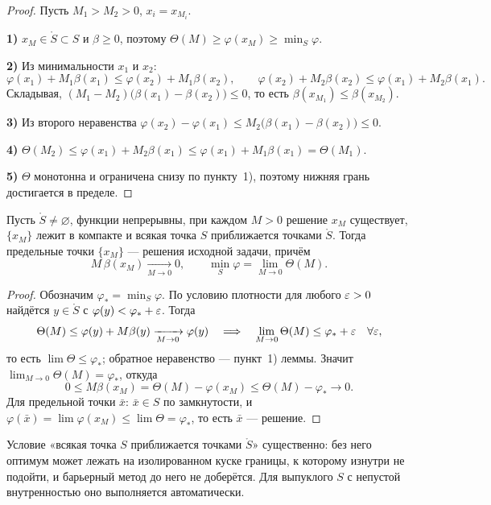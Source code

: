 \begin{proof}
Пусть $M_1 > M_2 > 0$, $x_i = x_{M_i}$.

\textbf{1)} $x_M \in \mathring{S} \subset S$ и $\beta \ge 0$, поэтому
$\Theta(M) \ge \varphi(x_M) \ge \min_S\varphi$.

\textbf{2)} Из минимальности $x_1$ и $x_2$:
\[
  \varphi(x_1) + M_1\beta(x_1) \le \varphi(x_2) + M_1\beta(x_2) ,
  \qquad
  \varphi(x_2) + M_2\beta(x_2) \le \varphi(x_1) + M_2\beta(x_1) .
\]
Складывая, $(M_1 - M_2)\big(\beta(x_1) - \beta(x_2)\big) \le 0$, то есть
$\beta(x_{M_1}) \le \beta(x_{M_2})$.

\textbf{3)} Из второго неравенства
$\varphi(x_2) - \varphi(x_1) \le M_2\big(\beta(x_1) - \beta(x_2)\big) \le 0$.

\textbf{4)}
$\Theta(M_2) \le \varphi(x_1) + M_2\beta(x_1) \le \varphi(x_1) + M_1\beta(x_1)
 = \Theta(M_1)$.

\textbf{5)} $\Theta$ монотонна и ограничена снизу по пункту~1), поэтому нижняя
грань достигается в пределе.
\end{proof}

\begin{theorem}\label{thm:barrier}
Пусть $\mathring{S} \ne \varnothing$, функции непрерывны, при каждом $M > 0$
решение $x_M$ существует, $\{x_M\}$ лежит в компакте и всякая точка $S$
приближается точками $\mathring{S}$. Тогда предельные точки $\{x_M\}$ —
решения исходной задачи, причём
\[
  M\,\beta(x_M) \xrightarrow[M \to 0]{} 0 ,
  \qquad
  \min_{S}\varphi = \lim_{M \to 0}\Theta(M) .
\]
\end{theorem}

\begin{proof}
Обозначим $\varphi_* = \min_S\varphi$. По условию плотности для любого
$\varepsilon > 0$ найдётся $y \in \mathring{S}$ с $\varphi(y) < \varphi_* + \varepsilon$.
Тогда
\[
  \Theta(M) \le \varphi(y) + M\beta(y) \xrightarrow[M\to0]{} \varphi(y)
  \quad\Longrightarrow\quad
  \lim_{M\to0}\Theta(M) \le \varphi_* + \varepsilon \quad \forall \varepsilon ,
\]
то есть $\lim\Theta \le \varphi_*$; обратное неравенство — пункт~1) леммы.
Значит $\lim_{M\to0}\Theta(M) = \varphi_*$, откуда
\[
  0 \le M\beta(x_M) = \Theta(M) - \varphi(x_M)
    \le \Theta(M) - \varphi_* \longrightarrow 0 .
\]
Для предельной точки $\bar{x}$: $\bar{x} \in S$ по замкнутости, и
$\varphi(\bar{x}) = \lim\varphi(x_M) \le \lim\Theta = \varphi_*$, то есть
$\bar{x}$ — решение.
\end{proof}

\begin{idea}
Условие «всякая точка $S$ приближается точками $\mathring{S}$» существенно:
без него оптимум может лежать на изолированном куске границы, к которому
изнутри не подойти, и барьерный метод до него не доберётся. Для выпуклого $S$
с непустой внутренностью оно выполняется автоматически.
\end{idea}

